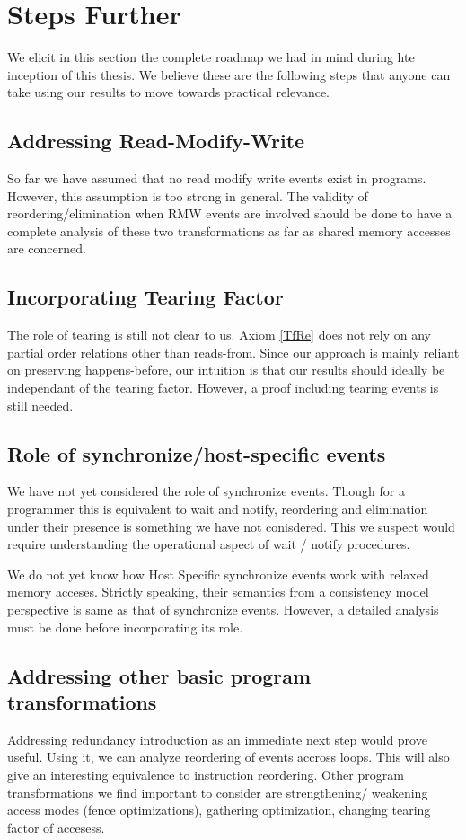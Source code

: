 \section{Steps Further}

    We elicit in this section the complete roadmap we had in mind during hte inception of this thesis. 
    We believe these are the following steps that anyone can take using our results to move towards practical relevance.

    \subsection{Addressing Read-Modify-Write}
        So far we have assumed that no read modify write events exist in programs.
        However, this assumption is too strong in general.
        The validity of reordering/elimination when RMW events are involved should be done to have a complete analysis of these two transformations as far as shared memory accesses are concerned.

    \subsection{Incorporating Tearing Factor}
        The role of tearing is still not clear to us.
        Axiom \ref{TfRe} does not rely on any partial order relations other than reads-from. 
        Since our approach is mainly reliant on preserving happens-before, our intuition is that our results should ideally be independant of the tearing factor.
        However, a proof including tearing events is still needed.   
  
    \subsection{Role of synchronize/host-specific events}
        We have not yet considered the role of synchronize events. 
        Though for a programmer this is equivalent to wait and notify, reordering and elimination under their presence is something we have not conisdered. 
        This we suspect would require understanding the operational aspect of wait / notify procedures.

        We do not yet know how Host Specific synchronize events work with relaxed memory acceses.
        Strictly speaking, their semantics from a consistency model perspective is same as that of synchronize events. 
        However, a detailed analysis must be done before incorporating its role. 
    
    \subsection{Addressing other basic program transformations}
        Addressing redundancy introduction as an immediate next step would prove useful.
        Using it, we can analyze reordering of events accross loops. 
        This will also give an interesting equivalence to instruction reordering. 
        Other program transformations we find important to consider are strengthening/ weakening access modes (fence optimizations), gathering optimization, changing tearing factor of accesess. 
    
    